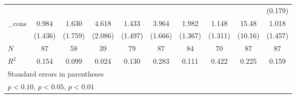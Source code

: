 {\begin{tabular}{l*{9}{c}}
            &                     &                     &                     &                     &                     &                     &                     &                     &     (0.179)         \\
[1em]
\_cons      &       0.984         &       1.630         &       4.618\sym{**} &       1.433         &       3.964\sym{**} &       1.982         &       1.148         &       15.48         &       1.018         \\
            &     (1.436)         &     (1.759)         &     (2.086)         &     (1.497)         &     (1.666)         &     (1.367)         &     (1.311)         &     (10.16)         &     (1.457)         \\
\hline
\(N\)       &          87         &          58         &          39         &          79         &          87         &          84         &          70         &          87         &          87         \\
\(R^{2}\)   &       0.154         &       0.099         &       0.024         &       0.130         &       0.283         &       0.111         &       0.422         &       0.225         &       0.159         \\
\hline\hline
\multicolumn{10}{l}{\footnotesize Standard errors in parentheses}\\
\multicolumn{10}{l}{\footnotesize \sym{*} \(p<0.10\), \sym{**} \(p<0.05\), \sym{***} \(p<0.01\)}\\
\end{tabular}
}
